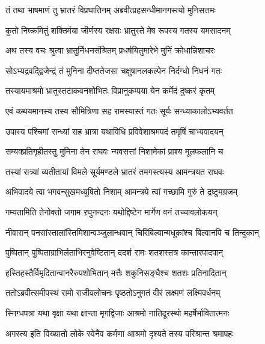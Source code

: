 \twolineshloka
{तं तथा भाषमाणं तु भ्रातरं विप्रघातिनम्}
{अब्रवीत्प्रहसन्धीमानगस्त्यो मुनिसत्तमः} %

\twolineshloka
{कुतो निष्क्रमितुं शक्तिर्मया जीर्णस्य रक्षसः}
{भ्रातुस्ते मेष रूपस्य गतस्य यमसादनम्} %

\twolineshloka
{अथ तस्य वचः श्रुत्वा भ्रातुर्निधनसंश्रितम्}
{प्रधर्षयितुमारेभे मुनिं क्रोधान्निशाचरः} %

\twolineshloka
{सोऽभ्यद्रवद्द्विजेन्द्रं तं मुनिना दीप्ततेजसा}
{चक्षुषानलकल्पेन निर्दग्धो निधनं गतः} %

\twolineshloka
{तस्यायमाश्रमो भ्रातुस्तटाकवनशोभितः}
{विप्रानुकम्पया येन कर्मेदं दुष्करं कृतम्} %

\twolineshloka
{एवं कथयमानस्य तस्य सौमित्रिणा सह}
{रामस्यास्तं गतः सूर्यः सन्ध्याकालोऽभ्यवर्तत} %

\twolineshloka
{उपास्य पश्चिमां सन्ध्यां सह भ्रात्रा यथाविधि}
{प्रविवेशाश्रमपदं तमृषिं चाभ्यवादयन्} %

\twolineshloka
{सम्यक्प्रतिगृहीतस्तु मुनिना तेन राघवः}
{न्यवसत्तां निशामेकां प्राश्य मूलफलानि च} %

\twolineshloka
{तस्यां रात्र्यां व्यतीतायां विमले सूर्यमण्डले}
{भ्रातरं तमगस्त्यस्य आमन्त्रयत राघवः} %

\twolineshloka
{अभिवादये त्वा भगवन्सुखमध्युषितो निशाम्}
{आमन्त्रये त्वां गच्छामि गुरुं ते द्रष्टुमग्रजम्} %

\twolineshloka
{गम्यतामिति तेनोक्तो जगाम रघुनन्दनः}
{यथोद्दिष्टेन मार्गेण वनं तच्चावलोकयन्} %

\twolineshloka
{नीवारान् पनसांस्तालांस्तिमिशान्वञ्जुलान्धवान्}
{चिरिबिल्वान्मधूकांश्च बिल्वानपि च तिन्दुकान्} %

\twolineshloka
{पुष्पितान् पुष्पिताग्राभिर्लताभिरनुवेष्टितान्}
{ददर्श रामः शतशस्तत्र कान्तारपादपान्} %

\twolineshloka
{हस्तिहस्तैर्विमृदितान्वानरैरुपशोभितान्}
{मत्तैः शकुनिसङ्घैश्च शतशः प्रतिनादितान्} %

\twolineshloka
{ततोऽब्रवीत्समीपस्थं रामो राजीवलोचनः}
{पृष्ठतोऽनुगतं वीरं लक्ष्मणं लक्ष्मिवर्धनम्} %

\twolineshloka
{स्निग्धपत्रा यथा वृक्षा यथा क्षान्ता मृगद्विजाः}
{आश्रमो नातिदूरस्थो महर्षेर्भावितात्मनः} %

\twolineshloka
{अगस्त्य इति विख्यातो लोके स्वेनैव कर्मणा}
{आश्रमो दृश्यते तस्य परिश्रान्त श्रमापहः} %

